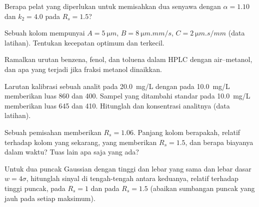\begin{exercise}[$\star\star$]\label{exo:b2:chromatography:6}
Berapa pelat yang diperlukan untuk memisahkan dua senyawa dengan $\alpha = 1.10$ dan $k_2 = 4.0$ pada
$R_s = 1.5$?
\end{exercise}

\begin{exercise}[$\star\star$]\label{exo:b2:chromatography:7}
Sebuah kolom mempunyai $A = \qty{5}{\micro m}$, $B = \qty{8}{\micro m.mm/s}$, $C = \qty{2}{\micro m.s/mm}$
(data latihan). Tentukan kecepatan optimum dan  terkecil.
\end{exercise}

\begin{exercise}[$\star\star$]\label{exo:b2:chromatography:8}
Ramalkan urutan  benzena, fenol, dan toluena dalam HPLC 
dengan  air--metanol, dan apa yang terjadi jika fraksi metanol
dinaikkan.
\end{exercise}

\begin{exercise}[$\star\star$]\label{exo:b2:chromatography:9}
Larutan kalibrasi sebuah analit pada \qty{20.0}{mg/L} dengan 
pada \qty{10.0}{mg/L} memberikan luas 860 dan 400. Sampel yang ditambahi
standar pada \qty{10.0}{mg/L} memberikan luas 645 dan 410. Hitunglah  dan konsentrasi analitnya (data latihan).
\end{exercise}

\begin{exercise}[$\star\star\star$]\label{exo:b2:chromatography:10}
Sebuah pemisahan memberikan $R_s = 1.06$. Panjang kolom berapakah,
relatif terhadap kolom yang sekarang, yang memberikan $R_s = 1.5$, dan
berapa biayanya dalam waktu? Tuas lain apa saja yang ada?
\end{exercise}

\begin{exercise}[$\star\star\star$]\label{exo:b2:chromatography:11}
Untuk dua puncak Gaussian dengan tinggi dan lebar yang sama dan lebar dasar
$w = 4\sigma$, hitunglah sinyal di tengah-tengah antara keduanya, relatif
terhadap tinggi puncak, pada $R_s = 1$ dan pada $R_s = 1.5$ (abaikan
sumbangan puncak yang jauh pada setiap maksimum).
\end{exercise}


